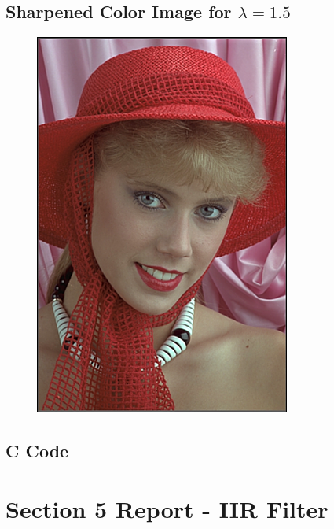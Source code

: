 \documentclass{article}
\begin{document}
\subsection{Sharpened Color Image for $\lambda = 1.5$}
\begin{figure}[H]
    \centering
    \includegraphics[width=0.75\textwidth]{../results/sharpened.png}
    \begin{center}
    \end{center}
\end{figure}
\subsection{C Code}


\section{Section 5 Report - IIR Filter}
\end{document}
